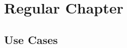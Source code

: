 \documentclass[]{article}
\begin{document}

\newpage

\newpage

\newpage

\newpage

\newpage


\newpage

\newpage

\chapter{Regular Chapter}
\begin{appendices}
\chapter{Use Cases}

\end{appendices}



\nocite{*}
\end{document}
